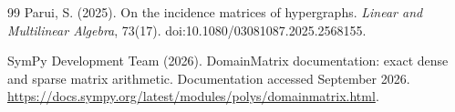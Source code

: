 \documentclass[11pt]{article}
\theoremstyle{definition}
\newcommand{\1}{\mathbf{1}}
\begin{document}
\begin{thebibliography}{99}
Parui, S. (2025).
\newblock On the incidence matrices of hypergraphs.
\newblock \emph{Linear and Multilinear Algebra}, 73(17). doi:10.1080/03081087.2025.2568155.

SymPy Development Team (2026).
\newblock DomainMatrix documentation: exact dense and sparse matrix arithmetic.
\newblock Documentation accessed September 2026. \url{https://docs.sympy.org/latest/modules/polys/domainmatrix.html}.

\end{thebibliography}
\end{document}

